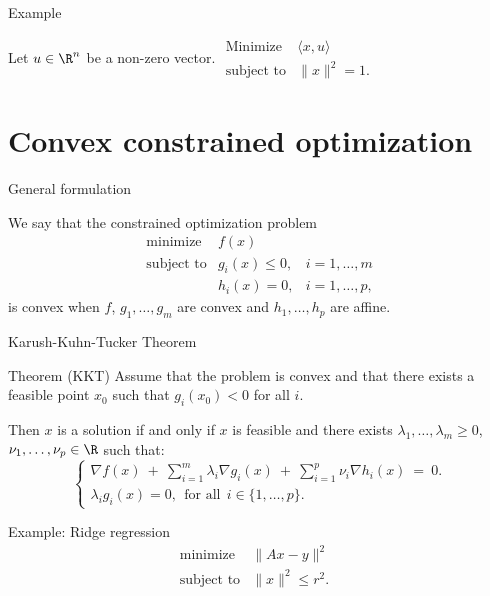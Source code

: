 \documentclass{beamer}
\begin{document}
\begin{frame}[t]{Example}
	\grid

	\vspace{-0.2cm}
	Let $u \in \R^n$ be a non-zero vector. \quad
	$
	\begin{array}{lll}
		\text{Minimize} & \langle x,u \rangle & \\
		\text{subject to} & \|x\|^2 = 1.
	\end{array}
	$
	\pause
\end{frame}


\section{Convex constrained optimization}


\begin{frame}[t]{General formulation}
	\grid

	We say that the constrained optimization problem
	$$
		\begin{array}{lll}
			\text{minimize} & f(x) & \\
			\text{subject to} & g_i(x) \leq 0, & i=1, \dots, m \\
							  & h_i(x) = 0, & i=1, \dots, p,
		\end{array}
		$$
	is convex when $f$, $g_1, \dots, g_m$ are convex and $h_1, \dots, h_p$ are affine.
\end{frame}

\begin{frame}[t]{Karush-Kuhn-Tucker Theorem}
	\grid

	\vspace{-0.4cm}
	\begin{block}{Theorem (KKT)}
		Assume that the problem is convex and that there exists a feasible point $x_0$ such that $g_i(x_0) < 0$ for all $i$.

		Then $x$ is a solution if and only if $x$ is feasible and there exists $\lambda_1, \dots, \lambda_m \geq 0$, $\nu_1, \dots, \nu_p \in \R$ such that:
		$$
		\begin{cases}
			\displaystyle
			\nabla f(x) \ + \ \sum_{i=1}^m \lambda_i \nabla g_i(x) \ + \ \sum_{i=1}^p \nu_i \nabla h_i(x)  \ = \ 0. \\
			\lambda_i g_i(x) = 0, \ \ \text{for all} \ \ i \in \{1, \dots, p\}.
		\end{cases}
		$$
		\vspace{-0.3cm}
	\end{block}

\end{frame}
\begin{frame}[t]{Example: Ridge regression}
	\grid
	$$
		\begin{array}{lll}
			\text{minimize} & \|Ax-y\|^2 & \\
			\text{subject to} & \|x\|^2 \leq r^2.
		\end{array}
		$$
	 
		\pause
\end{frame}
\end{document}
